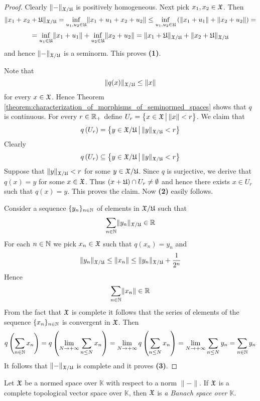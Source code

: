 \documentclass[10pt]{amsart}
\begin{document}
\begin{proof}
	Clearly $\lVert - \rVert_{{\mathfrak X}/{\mathfrak U}}$ is positively homogeneous. Next pick $x_1,x_2 \in {\mathfrak X}$. Then
	$$\lVert x_1 + x_2 + {\mathfrak U}\rVert_{{\mathfrak X}/{\mathfrak U}} = \inf_{u_1,u_2 \in {\mathfrak U}} \lVert x_1 + u_1 + x_2 + u_2\rVert \leq \inf_{u_1,u_2 \in {\mathfrak U}}\left(\lVert x_1 + u_1\rVert + \lVert x_2 + u_2\rVert\right) =$$
	$$=  \inf_{u_1\in {\mathfrak U}} \lVert x_1 + u_1\rVert + \inf_{u_2\in {\mathfrak U}} \lVert x_2 + u_2\rVert = \lVert x_1 + {\mathfrak U}\rVert_{{\mathfrak X}/{\mathfrak U}} + \lVert x_2 + {\mathfrak U} \rVert_{{\mathfrak X}/{\mathfrak U}}$$
	and hence $\lVert - \rVert_{{\mathfrak X}/{\mathfrak U}}$ is a seminorm. This proves \textbf{(1)}.

	Note that
	$$\lVert q(x) \rVert_{{\mathfrak X}/{\mathfrak U}} \leq \lVert x \rVert$$
	for every $x \in {\mathfrak X}$. Hence Theorem \ref{theorem:characterization_of_morphisms_of_seminormed_spaces} shows that $q$ is continuous. For every $r \in {\mathbb R}_+$ define $U_r = \big\{x\in {\mathfrak X}\,\big|\,\lVert x \rVert < r\big\}$. We claim that
	$$q\left(U_r\right) = \big\{y\in {\mathfrak X}/{\mathfrak U}\,\big|\,\lVert y \rVert_{{\mathfrak X}/{\mathfrak U}} < r\big\}$$
	Clearly
	$$q\left(U_r\right) \subseteq \big\{y\in {\mathfrak X}/{\mathfrak U}\,\big|\,\lVert y \rVert_{{\mathfrak X}/{\mathfrak U}} < r\big\}$$
	Suppose that $\lVert y \rVert_{{\mathfrak X}/{\mathfrak U}} < r$ for some $y \in {\mathfrak X}/{\mathfrak U}$. Since $q$ is surjective, we derive that $q(x) = y$ for some $x \in {\mathfrak X}$. Thus $\left(x + {\mathfrak U}\right) \cap U_r\neq \emptyset$ and hence there exists $x \in U_r$ such that $q(x) = y$. This proves the claim. Now \textbf{(2)} easily follows.

	Consider a sequence $\{y_n\}_{n \in {\mathbb N}}$ of elements in ${\mathfrak X}/{\mathfrak U}$ such that
	$$\sum_{n \in {\mathbb N}} \lVert y_n \rVert_{{\mathfrak X}/{\mathfrak U}} \in {\mathbb R}$$
	For each $n \in {\mathbb N}$ we pick $x_n \in {\mathfrak X}$ such that $q(x_n) = y_n$ and
	$$\lVert y_n \rVert_{{\mathfrak X}/{\mathfrak U}} \leq \lVert x_n \rVert \leq \lVert y_n \rVert_{{\mathfrak X}/{\mathfrak U}} + \frac{1}{2^n}$$
	Hence
	$$\sum_{n \in {\mathbb N}}\lVert x_n \rVert \in {\mathbb R}$$
	From the fact that ${\mathfrak X}$ is complete it follows that the series of elements of the sequence $\{x_n\}_{n\in {\mathbb N}}$ is convergent in ${\mathfrak X}$. Then
	$$q\left(\sum_{n \in {\mathbb N}}x_n\right) = q\left(\lim_{N \rightarrow +\infty}\sum_{n\leq N}x_n\right) = \lim_{N\rightarrow +\infty}q\left(\sum_{n \leq N}x_n\right) = \lim_{N\rightarrow +\infty}\sum_{n \leq N}y_n = \sum_{n \in {\mathbb N}}y_n$$
	It follows that $\lVert - \rVert_{{\mathfrak X}/{\mathfrak U}}$ is complete and it proves \textbf{(3)}.
\end{proof}

\begin{definition}
	Let ${\mathfrak X}$ be a normed space over $\mathbb{K}$ with respect to a norm $\lVert - \rVert$. If ${\mathfrak X}$ is a complete topological vector space over $\mathbb{K}$, then ${\mathfrak X}$ is \textit{a Banach space over $\mathbb{K}$}.
\end{definition}
\end{document}
